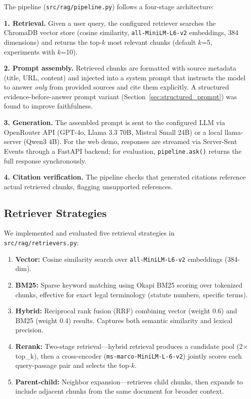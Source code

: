 \documentclass{article}
\begin{document}
The pipeline (\texttt{src/rag/pipeline.py}) follows a four-stage architecture:

\textbf{1. Retrieval.} Given a user query, the configured retriever searches the ChromaDB vector store (cosine similarity, \texttt{all-MiniLM-L6-v2} embeddings, 384 dimensions) and returns the top-$k$ most relevant chunks (default $k$=5, experiments with $k$=10).

\textbf{2. Prompt assembly.} Retrieved chunks are formatted with source metadata (title, URL, content) and injected into a system prompt that instructs the model to answer \emph{only} from provided sources and cite them explicitly. A structured evidence-before-answer prompt variant (Section~\ref{sec:structured_prompt}) was found to improve faithfulness.

\textbf{3. Generation.} The assembled prompt is sent to the configured LLM via OpenRouter API (GPT-4o, Llama 3.3 70B, Mistral Small 24B) or a local llama-server (Qwen3 4B). For the web demo, responses are streamed via Server-Sent Events through a FastAPI backend; for evaluation, \texttt{pipeline.ask()} returns the full response synchronously.

\textbf{4. Citation verification.} The pipeline checks that generated citations reference actual retrieved chunks, flagging unsupported references.

\subsection{Retriever Strategies}
\label{sec:retrievers}

We implemented and evaluated five retrieval strategies in \texttt{src/rag/retrievers.py}:

\begin{enumerate}
    \item \textbf{Vector:} Cosine similarity search over \texttt{all-MiniLM-L6-v2} embeddings (384-dim).
    \item \textbf{BM25:} Sparse keyword matching using Okapi BM25 scoring over tokenized chunks, effective for exact legal terminology (statute numbers, specific terms).
    \item \textbf{Hybrid:} Reciprocal rank fusion (RRF) combining vector (weight 0.6) and BM25 (weight 0.4) results. Captures both semantic similarity and lexical precision.
    \item \textbf{Rerank:} Two-stage retrieval---hybrid retrieval produces a candidate pool (2$\times$ top\_k), then a cross-encoder (\texttt{ms-marco-MiniLM-L-6-v2}) jointly scores each query-passage pair and selects the top-$k$.
    \item \textbf{Parent-child:} Neighbor expansion---retrieves child chunks, then expands to include adjacent chunks from the same document for broader context.
\end{enumerate}
\end{document}
